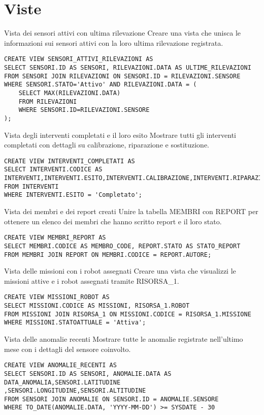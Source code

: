 \section{Viste}
\begin{description}
\item{Vista dei sensori attivi con ultima rilevazione}
Creare una vista che unisca le informazioni sui sensori attivi con la loro ultima rilevazione registrata.
\begin{verbatim}
CREATE VIEW SENSORI_ATTIVI_RILEVAZIONI AS
SELECT SENSORI.ID AS SENSORI, RILEVAZIONI.DATA AS ULTIME_RILEVAZIONI
FROM SENSORI JOIN RILEVAZIONI ON SENSORI.ID = RILEVAZIONI.SENSORE
WHERE SENSORI.STATO='Attivo' AND RILEVAZIONI.DATA = (
    SELECT MAX(RILEVAZIONI.DATA)
    FROM RILEVAZIONI
    WHERE SENSORI.ID=RILEVAZIONI.SENSORE
);
\end{verbatim}
\item{Vista degli interventi completati e il loro esito}
Mostrare tutti gli interventi completati con dettagli su calibrazione, riparazione e sostituzione.
\begin{verbatim}
CREATE VIEW INTERVENTI_COMPLETATI AS
SELECT INTERVENTI.CODICE AS INTERVENTI,INTERVENTI.ESITO,INTERVENTI.CALIBRAZIONE,INTERVENTI.RIPARAZIONE,INTERVENTI.SOSTITUZIONE
FROM INTERVENTI
WHERE INTERVENTI.ESITO = 'Completato';
\end{verbatim}
\item{Vista dei membri e dei report creati}
Unire la tabella MEMBRI con REPORT per ottenere un elenco dei membri che hanno scritto report e il loro stato.
\begin{verbatim}
CREATE VIEW MEMBRI_REPORT AS
SELECT MEMBRI.CODICE AS MEMBRO_CODE, REPORT.STATO AS STATO_REPORT
FROM MEMBRI JOIN REPORT ON MEMBRI.CODICE = REPORT.AUTORE;
\end{verbatim}
\item{Vista delle missioni con i robot assegnati}
Creare una vista che visualizzi le missioni attive e i robot assegnati tramite RISORSA_1.
\begin{verbatim}
CREATE VIEW MISSIONI_ROBOT AS
SELECT MISSIONI.CODICE AS MISSIONI, RISORSA_1.ROBOT
FROM MISSIONI JOIN RISORSA_1 ON MISSIONI.CODICE = RISORSA_1.MISSIONE
WHERE MISSIONI.STATOATTUALE = 'Attiva'; 
\end{verbatim}
\item{Vista delle anomalie recenti}
Mostrare tutte le anomalie registrate nell’ultimo mese con i dettagli del sensore coinvolto.
\begin{verbatim}
CREATE VIEW ANOMALIE_RECENTI AS
SELECT SENSORI.ID AS SENSORI, ANOMALIE.DATA AS DATA_ANOMALIA,SENSORI.LATITUDINE ,SENSORI.LONGITUDINE,SENSORI.ALTITUDINE
FROM SENSORI JOIN ANOMALIE ON SENSORI.ID = ANOMALIE.SENSORE
WHERE TO_DATE(ANOMALIE.DATA, 'YYYY-MM-DD') >= SYSDATE - 30
\end{verbatim}
\end{description}
